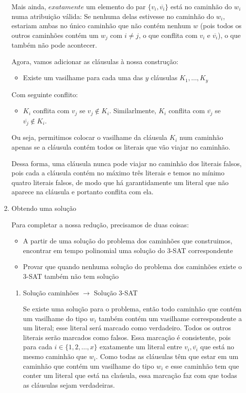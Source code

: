 \documentclass[11pt]{article}
\begin{document}
\begin{enumerate}
Mais ainda, $\textit{exatamente}$ um elemento do par $\{v_i,
\overline{v_i}\}$ está no caminhão do $w_i$ numa atribuição válida: Se
nenhuma delas estivesse no caminhão do $w_i$, estariam ambas no único
caminhão que não contém nenhum $w$ (pois todos os outros caminhões
contém um $w_j$ com $i \neq j$, o que conflita com $v_i$ e
$\overline{v_i}$), o que também não pode acontecer.


Agora, vamos adicionar as cláusulas à nossa construção:

\begin{itemize}
\item Existe um vasilhame para cada uma das $y$ cláusulas $K_1, \ldots, K_y$
\end{itemize}

Com seguinte conflito:

\begin{itemize}
\item $K_i$ conflita com $v_j$ se $v_j \not\in K_i$. Similarlmente, $K_i$
  conflita com $\overline{v_j}$ se $\overline{v_j} \not\in K_i$.
\end{itemize}

Ou seja, permitimos colocar o vasilhame da cláusula $K_i$ num caminhão
apenas se a cláusula contém todos os literais que vão viajar no
caminhão.

Dessa forma, uma cláusula nunca pode viajar no caminhão dos literais
falsos, pois cada a cláusula contém no máximo três literais e temos no
mínimo quatro literais falsos, de modo que há garantidamente um
literal que não aparece na cláusula e portanto conflita com ela.

\item Obtendo uma solução
\label{sec-5-3-2-2}

Para completar a nossa redução, precisamos de duas coisas:
\begin{itemize}
\item A partir de uma solução do problema dos caminhões que construimos,
encontrar em tempo polinomial uma solução do 3-SAT correspondente
\item Provar que quando nenhuma solução do problema dos caminhões existe o
3-SAT também não tem solução
\end{itemize}

\begin{enumerate}
\item Solução caminhões $\to$ Solução 3-SAT
\label{sec-5-3-2-2-1}

Se existe uma solução para o problema, então todo caminhão que contém
um vasilhame do tipo $w_i$ também contém um vasilhame correspondente a
um literal; esse literal será marcado como verdadeiro. Todos os outros
literais serão marcados como falsos. Essa marcação é consistente, pois
para cada $i \in \{1, 2, \ldots, x\}$ exatamente um literal entre
$v_i, \overline{v_i}$ que está no mesmo caminhão que $w_i$. Como todas as
cláusulas têm que estar em um caminhão que contém um vasilhame do tipo
$w_i$ e esse caminhão tem que conter um literal que está na claúsula,
essa marcação faz com que todas as cláusulas sejam verdadeiras.



\end{enumerate}
\end{enumerate}
\end{document}
